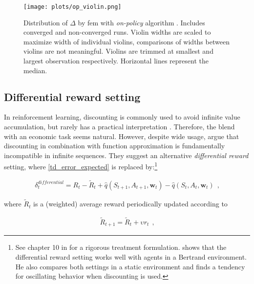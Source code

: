 \begin{figure}
	\texttt{[image: plots/op\_violin.png]}
	\caption[Distribution of $\Delta$ by \gls{fem} with \emph{on-policy} algorithm ]{Distribution of $\Delta$ by \gls{fem} with \emph{on-policy} algorithm . Includes converged and non-converged runs. Violin widths are scaled to maximize width of individual violins, comparisons of widths between violins are not meaningful. Violins are trimmed at smallest and largest observation respectively. Horizontal lines represent the median.}
	\label{op_violin}
\end{figure}

		
\subsection{Differential reward setting}\label{differential}

In reinforcement learning, discounting is commonly used to avoid infinite value accumulation, but rarely has a practical interpretation \parencite{schwartz_reinforcement_1993}. Therefore, the blend with an economic task seems natural. However, despite wide usage, \textcite{naik_discounted_2019} argue that discounting in combination with function approximation is fundamentally incompatible in infinite sequences. They suggest an alternative \emph{differential reward} setting, where \autoref{td_error_expected} is replaced by:\footnote{See chapter 10 in \textcite[pp.249-252]{sutton_reinforcement_2018} for a rigorous treatment formulation. \textcite{hettich_algorithmic_2021} shows that the differential reward setting works well with agents in a Bertrand environment. He also compares both settings in a static environment and finds a tendency for oscillating behavior when discounting is used.}


\begin{gather}\label{differential_reward}
\delta_t^{differential} = R_t - \widetilde{R}_{t} + \hat{q}(S_{t+1}, A_{t+1}, \boldsymbol{w}_t) - \hat{q}(S_t, A_t, \boldsymbol{w}_t) ~~  \text{,}
\end{gather}

where $\widetilde{R}_{t}$ is a (weighted) average reward periodically updated according to

\begin{gather}
	\widetilde{R}_{t+1} = \widetilde{R}_t + \upsilon r_t ~~\text{,}
\end{gather}

